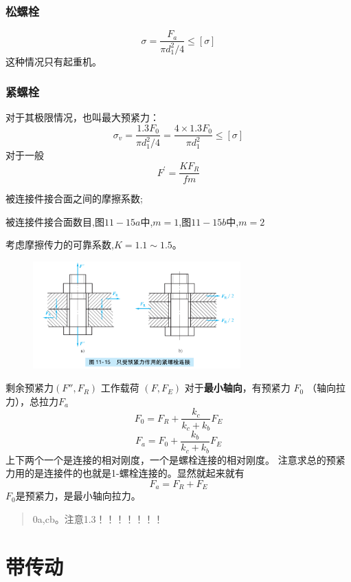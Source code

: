 \documentclass[twocolumn]{ctexart}
\begin{document}
\subsubsection{松螺栓}
$$
\sigma = \frac{F_{a}}{\pi d_{1}^{2}/4}\leq \left[ \sigma \right]
$$
这种情况只有起重机。
\subsubsection{紧螺栓}
对于其极限情况，也叫最大预紧力：
$$  \sigma _{v}= \frac{1.3F_0}{\pi d_{1}^{2}/4}= \frac{4 \times 1.3F_0}{\pi d_{1}^{2}}\leq \left[ \sigma \right] $$
对于一般
$$ F^{\prime}= \frac{KF_{R}}{fm} $$
\begin{description}[leftmargin=0.7cm,style=nextline,nosep]%
  \item[f] 被连接件接合面之间的摩擦系数;
  \item[m] 被连接件接合面数目,图$ 11-15a $中,$ m=1 $,图$ 11-15b $中,$ m=2 $
  \item[K] 考虑摩擦传力的可靠系数,$ K=1.1 \sim 1.5 $。
   
\end{description}
        \begin{figure}[H]
            \centering
            \includegraphics[width=8cm]{img/8.png}
            \end{figure}
剩余预紧力$(F'',F_R)$ 工作载荷 $(F,F_E)$
对于\textbf{最小轴向}，有预紧力 $F_0$ （轴向拉力），总拉力$F_a$
$$ F_0=F_R+ \frac{k_{c}}{k_{c}+k_{b}}F_E $$
$$ F_a=F_0+ \frac{k_{b}}{k_{c}+k_{b}}F_E $$
上下两个一个是连接的相对刚度，一个是螺栓连接的相对刚度。
注意求总的预紧力用的是连接件的也就是1-螺栓连接的。显然就起来就有
$$
F_a =F_R+F_E
$$
$F_0$是预紧力，是最小轴向拉力。
\begin{quote}
{\qquad{}\ccwd\kaishu{}
0a,cb。注意1.3！！！！！！！
}
\end{quote}
\section{带传动}
\end{document}
